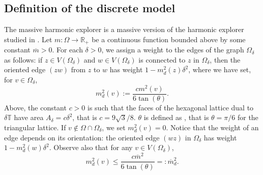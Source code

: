 \documentclass{article}
\theoremstyle{definition}
\theoremstyle{remark}
\theoremstyle{remark}
\begin{document}
\subsection{Definition of the discrete model} \label{subsec:def_mHE}

The massive harmonic explorer is a massive version of the harmonic explorer studied in \cite{HE}. Let $m: \Omega \to \mathbb{R}_{+}$ be a continuous function bounded above by some constant $\overline{m} > 0$. For each $\delta > 0$, we assign a weight to the edges of the graph $\Omega_{\delta}$ as follows: if $z \in V(\Omega_{\delta})$ and $w \in V(\Omega_{\delta})$ is connected to $z$ in $\Omega_{\delta}$, then the oriented edge $(zw)$ from $z$ to $w$ has weight $1-m_{d}^2(z)\delta^2$, where we have set, for $v \in \Omega_{\delta}$,
\begin{equation} \label{def_discrete_mass}
    m_d^2(v) := \frac{cm^2(v)}{6\tan(\theta)}.
\end{equation}
Above, the constant $c>0$ is such that the faces of the hexagonal lattice dual to $\delta \mathbb{T}$ have area $A_{\delta} = c\delta^2$, that is $c=9\sqrt{3}/8$. $\theta$ is defined as \cite[Figure~1.B]{Discrete_analysis}, that is $\theta = \pi/6$ for the triangular lattice. If $v \notin \Omega \cap \Omega_{\delta}$, we set $m_d^2(v) = 0$. Notice that the weight of an edge depends on its orientation: the oriented edge $(wz)$ in $\Omega_{\delta}$ has weight $1-m_d^2(w)\delta^2$. Observe also that for any $v \in V(\Omega_{\delta})$,
\begin{equation*}
    m_d^2(v) \leq \frac{c\overline{m}^2}{6\tan(\theta)} =: \overline{m}_{d}^{2}.
\end{equation*}
\end{document}
